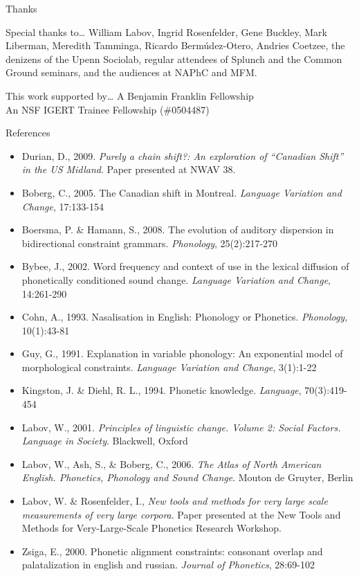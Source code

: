 \documentclass[]{beamer}
\begin{document}
\begin{frame}{Thanks}
	\begin{block}{Special thanks to\ldots}
		William Labov, Ingrid Rosenfelder, Gene Buckley, Mark Liberman, Meredith Tamminga, Ricardo Berm\'udez-Otero, Andries Coetzee, the denizens of the Upenn
		Sociolab, regular attendees of Splunch and the Common Ground seminars, and the audiences at NAPhC and MFM.
	\end{block}
	\begin{block}{This work supported by\ldots}
		A Benjamin Franklin Fellowship\\
		An NSF IGERT Trainee Fellowship (\#0504487)
	\end{block}
\end{frame}

\begin{frame}{References}
	\begin{itemize}
		\item [] 	\tiny{Durian, D., 2009. {\it Purely a chain shift?: An exploration of ``Canadian Shift'' in the US Midland}. Paper presented at NWAV 38.}
		\item [] 	\tiny{Boberg, C., 2005. The Canadian shift in Montreal. {\it Language Variation and Change}, 17:133-154}
		\item [] 	\tiny{Boersma, P. \& Hamann, S., 2008. The evolution of auditory dispersion in bidirectional constraint grammars. {\it Phonology}, 25(2):217-270}
		\item [] 	\tiny{Bybee, J., 2002. Word frequency and context of use in the lexical diffusion of phonetically conditioned sound change. 
					{\it Language Variation and Change}, 14:261-290}
		\item [] 	\tiny{Cohn, A., 1993. Nasalisation in English: Phonology or Phonetics. {\it Phonology}, 10(1):43-81}
		\item [] 	\tiny{Guy, G., 1991. Explanation in variable phonology: An exponential model of morphological constraints. {\it Language Variation and Change}, 3(1):1-22}
		\item [] 	\tiny{Kingston, J. \& Diehl, R. L., 1994. Phonetic knowledge. {\it Language}, 70(3):419-454}
		\item [] 	\tiny{Labov, W., 2001. {\it Principles of linguistic change. Volume 2: Social Factors. Language in Society}. Blackwell, Oxford}
		\item [] 	\tiny{Labov, W., Ash, S., \& Boberg, C., 2006. {\it The Atlas of North American English. Phonetics, Phonology and Sound Change}. Mouton de Gruyter, Berlin}
		\item [] 	\tiny{Labov, W. \& Rosenfelder, I., {\it New tools and methods for very large scale measurements of very large corpora}. 
					Paper presented at the New Tools and Methods for Very-Large-Scale Phonetics Research Workshop.}
		\item [] 	\tiny{Zsiga, E., 2000. Phonetic alignment constraints: consonant overlap and palatalization in english and russian. {\it Journal of Phonetics}, 
					28:69-102}
	\end{itemize}
\end{frame}
\end{document}

